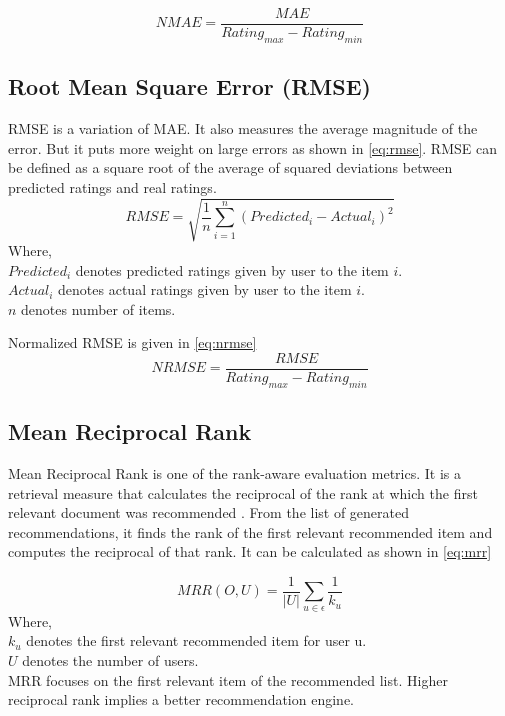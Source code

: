 \begin{equation}
NMAE = \frac{MAE} {Rating_{max} - Rating_{min}}
\label{eq:nmae}
\end{equation}


\subsection{Root Mean Square Error (RMSE)}
RMSE is a variation of MAE. It also measures the average magnitude of the error. But it puts more weight on large errors as shown in \autoref{eq:rmse}. RMSE can be defined as a square root of the average of squared deviations between predicted ratings and real ratings.
\begin{equation}
RMSE = \sqrt{ \frac{1}{n} \sum_{i=1}^{n}{({Predicted_i - Actual_i} ) ^ {2}}}
\label{eq:rmse}
\end{equation}
\noindent Where, \\
$Predicted_i$ \textsf{ denotes predicted ratings given by user to the item} $i.$ \\
$Actual_i$ \textsf{ denotes actual ratings given by user to the item } $i.$ \\
$n$ \textsf{denotes number of items.}

\noindent Normalized RMSE is given in \autoref{eq:nrmse}
\begin{equation}
NRMSE = \frac{RMSE} {Rating_{max} - Rating_{min}}
\label{eq:nrmse}
\end{equation}



\subsection{Mean Reciprocal Rank}

Mean Reciprocal Rank is one of the rank-aware evaluation metrics.
It is a retrieval measure that calculates the reciprocal of the rank at which the first relevant document was recommended \cite{27}.
From the list of generated recommendations, it finds the rank of the first relevant recommended item and computes the reciprocal of that rank. It can be calculated as shown in \autoref{eq:mrr}

\begin{equation}
MRR(O, U) = \frac{1}{\vert U \vert} \sum_{u \in \epsilon} \frac{1} {k_{u}}
\label{eq:mrr}
\end{equation}
\noindent Where, \\
$k_{u}$ denotes the first relevant recommended item for user u. \\
$U$  denotes the number of users. \\
MRR focuses on the first relevant item of the recommended list. Higher reciprocal rank implies a better recommendation engine.


